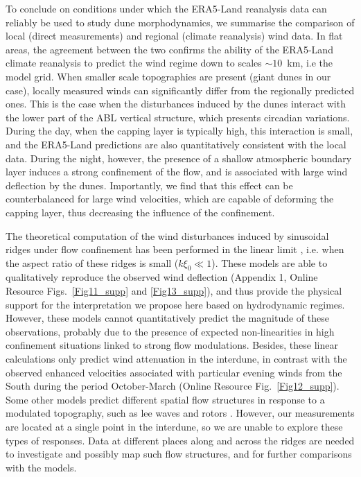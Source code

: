 To conclude on conditions under which the ERA5-Land reanalysis data can reliably be used to study dune morphodynamics, we summarise the comparison of local (direct measurements) and regional (climate reanalysis) wind data. In flat areas, the agreement between the two confirms the ability of the ERA5-Land climate reanalysis to predict the wind regime down to scales $\sim10$~km, i.e the model grid. When smaller scale topographies are present (giant dunes in our case), locally measured winds can significantly differ from the regionally predicted ones. This is the case when the disturbances induced by the dunes interact with the lower part of the ABL vertical structure, which presents circadian variations. During the day, when the capping layer is typically high, this interaction is small, and the ERA5-Land predictions are also quantitatively consistent with the local data. During the night, however, the presence of a shallow atmospheric boundary layer induces a strong confinement of the flow, and is associated with large wind deflection by the dunes. Importantly, we find that this effect can be counterbalanced for large wind velocities, which are capable of deforming the capping layer, thus decreasing the influence of the confinement.

The theoretical computation of the wind disturbances induced by sinusoidal ridges under flow confinement has been performed in the linear limit \citep{Andreotti2009, Andreotti2012}, i.e. when the aspect ratio of these ridges is small ($k\xi_0 \ll 1$). These models are able to qualitatively reproduce the observed wind deflection (Appendix 1, Online Resource Figs.~\ref{Fig11_supp} and \ref{Fig13_supp}), and thus provide the physical support for the interpretation we propose here based on hydrodynamic regimes. However, these models cannot quantitatively predict the magnitude of these observations, probably due to the presence of expected non-linearities in high confinement situations linked to strong flow modulations. Besides, these linear calculations only predict wind attenuation in the interdune, in contrast with the observed enhanced velocities associated with particular evening winds from the South during the period October-March (Online Resource Fig.~\ref{Fig12_supp}). Some other models predict different spatial flow structures in response to a modulated topography, such as lee waves and rotors \citep{baines1995, Vosper2004}. However, our measurements are located at a single point in the interdune, so we are unable to explore these types of responses. Data at different places along and across the ridges are needed to investigate and possibly map such flow structures, and for further comparisons with the models.


